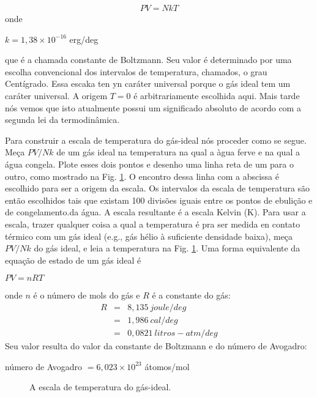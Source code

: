 \begin{itemize}
\begin{eqnarray*}
PV=NkT
\end{eqnarray*}
onde
\begin{center}
$k=1,38 \times 10^{-16}$ erg/deg
\end{center}
que \'e a chamada constante de Boltzmann. Seu valor \'e determinado por uma escolha convencional dos intervalos de temperatura, chamados, o grau Cent\'igrado. Essa escaka ten yn car\'ater universal porque o g\'as ideal tem um car\'ater universal. A origem $T=0$ \'e arbitrariamente escolhida aqui. Mais tarde n\'os vemos que isto atualmente possui um significado absoluto de acordo com a segunda lei da termodin\^amica.
\end{itemize}

Para construir a escala de temperatura do g\'as-ideal n\'os proceder como se segue. Me\c{c}a $PV/Nk$ de um g\'as ideal na temperatura na qual a \`agua ferve e na qual a \'agua congela. Plote esses dois pontos e desenho uma linha reta de um para o outro, como mostrado na Fig. \ref{figC01_002}. O encontro dessa linha com a abscissa \'e escolhido para ser a origem da escala. Os intervalos da escala de temperatura s\~ao ent\~ao escolhidos tais que existam 100 divis\~oes iguais entre os pontos de ebuli\c{c}\~ao e de congelamento.da \'agua. A escala resultante \'e a escala Kelvin (K). Para usar a escala, trazer qualquer coisa a qual a temperatura \'e pra ser medida en contato t\'ermico com um g\'as ideal (e.g., g\'as h\'elio \`a suficiente densidade baixa), me\c{c}a $PV/Nk$ do g\'as ideal, e leia a temperatura na Fig. \ref{figC01_002}. Uma forma equivalente da equa\c{c}\~ao de estado de um g\'as ideal \'e
\begin{center}
$PV=nRT$
\end{center}
onde $n$ \'e o n\'umero de mols do g\'as e $R$ \'e a constante do g\'as:
\begin{eqnarray*}
R&=&8,135 ~ joule/deg\\
&=&1,986 ~ cal/deg\\
&=&0,0821 ~ litros-atm/deg
\end{eqnarray*}
Seu valor resulta do valor da constante de Boltzmann e do n\'umero de Avogadro:
\begin{center}
n\'umero de Avogadro $=6,023 \times 10^{23}$ \'atomos/mol

\end{center}
\begin{figure}[h]
\begin{center}
\renewcommand{\figurename}{Fig.}
\caption{A escala de temperatura do g\'as-ideal.}
\label{figC01_002}
\end{center}
\end{figure}


